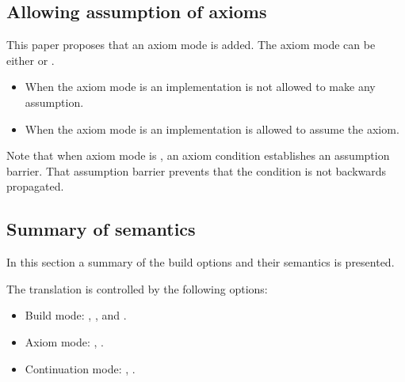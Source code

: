 \subsection{Allowing assumption of axioms}

This paper proposes that an axiom mode is added. The axiom mode can be either
 or .

\begin{itemize}
  \item When the axiom mode is  an implementation is not
        allowed to make any assumption.
  \item When the axiom mode is  an implementation is
        allowed to assume the axiom.
\end{itemize}

Note that when axiom mode is , an axiom condition establishes
an assumption barrier. That assumption barrier prevents that the condition
is not backwards propagated.

\subsection{Summary of semantics}

In this section a summary of the build options and their semantics is presented.

The translation is controlled by the following options:

\begin{itemize}
  \item Build mode: , , and .
  \item Axiom mode: , .
  \item Continuation mode: , .
\end{itemize}

